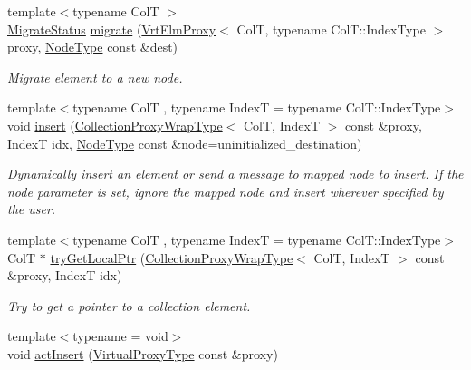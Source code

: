 \begin{DoxyCompactItemize}
{\footnotesize template$<$typename ColT $>$ }\\\hyperlink{namespacevt_1_1vrt_1_1collection_ad221ad8aea9e586689b4335f5bcd9804}{Migrate\+Status} \hyperlink{structvt_1_1vrt_1_1collection_1_1_collection_manager_aa78b0230c093abfbfc42629f36047c52}{migrate} (\hyperlink{structvt_1_1vrt_1_1collection_1_1_vrt_elm_proxy}{Vrt\+Elm\+Proxy}$<$ ColT, typename Col\+T\+::\+Index\+Type $>$ proxy, \hyperlink{namespacevt_a866da9d0efc19c0a1ce79e9e492f47e2}{Node\+Type} const \&dest)
\begin{DoxyCompactList}\small\item\em Migrate element to a new node. \end{DoxyCompactList}\item 
{\footnotesize template$<$typename ColT , typename IndexT  = typename Col\+T\+::\+Index\+Type$>$ }\\void \hyperlink{structvt_1_1vrt_1_1collection_1_1_collection_manager_af7c0033bd57a7dbb3e70888e7fb2e1a9}{insert} (\hyperlink{structvt_1_1vrt_1_1collection_1_1_collection_manager_a56458ed7f9bb22b631b9b3a745f42f94}{Collection\+Proxy\+Wrap\+Type}$<$ ColT, IndexT $>$ const \&proxy, IndexT idx, \hyperlink{namespacevt_a866da9d0efc19c0a1ce79e9e492f47e2}{Node\+Type} const \&node=uninitialized\+\_\+destination)
\begin{DoxyCompactList}\small\item\em Dynamically insert an element or send a message to mapped node to insert. If the {\ttfamily node} parameter is set, ignore the mapped node and insert wherever specified by the user. \end{DoxyCompactList}\item 
{\footnotesize template$<$typename ColT , typename IndexT  = typename Col\+T\+::\+Index\+Type$>$ }\\ColT $\ast$ \hyperlink{structvt_1_1vrt_1_1collection_1_1_collection_manager_a09bd0e2b03bd5f638bdc44f7ffeef715}{try\+Get\+Local\+Ptr} (\hyperlink{structvt_1_1vrt_1_1collection_1_1_collection_manager_a56458ed7f9bb22b631b9b3a745f42f94}{Collection\+Proxy\+Wrap\+Type}$<$ ColT, IndexT $>$ const \&proxy, IndexT idx)
\begin{DoxyCompactList}\small\item\em Try to get a pointer to a collection element. \end{DoxyCompactList}\item 
{\footnotesize template$<$typename  = void$>$ }\\void \hyperlink{structvt_1_1vrt_1_1collection_1_1_collection_manager_aba521bf30580ffe5a815b5e50bfbcbfe}{act\+Insert} (\hyperlink{namespacevt_a1b417dd5d684f045bb58a0ede70045ac}{Virtual\+Proxy\+Type} const \&proxy)

\end{DoxyCompactItemize}
